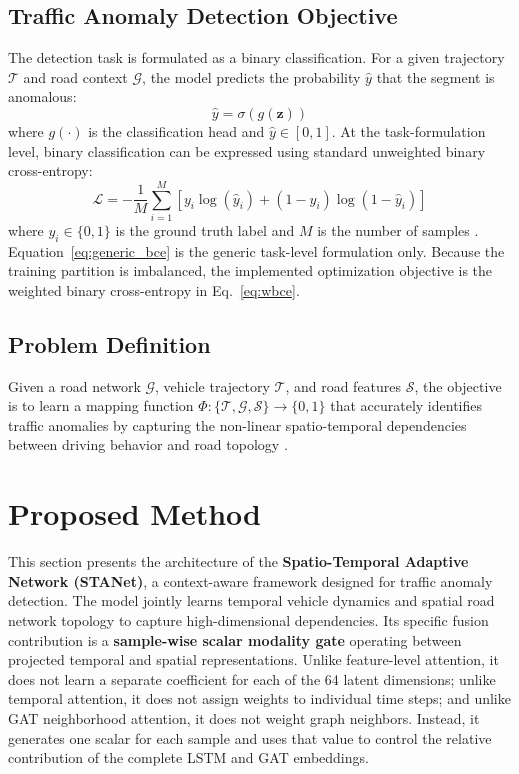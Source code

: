 \documentclass[journal]{IEEEtran}
\begin{document}
\subsection{Traffic Anomaly Detection Objective}
The detection task is formulated as a binary classification. For a given trajectory $\mathcal{T}$ and road context $\mathcal{G}$, the model predicts the probability $\hat{y}$ that the segment is anomalous:
\begin{equation}
  \hat{y} = \sigma(g(\mathbf{z}))
\end{equation}
where $g(\cdot)$ is the classification head and $\hat{y} \in [0, 1]$. At the task-formulation level, binary classification can be expressed using standard unweighted binary cross-entropy:
\begin{equation}
  \label{eq:generic_bce}
  \mathcal{L} = -\frac{1}{M} \sum_{i=1}^{M} [y_i \log(\hat{y}_i) + (1 - y_i) \log(1 - \hat{y}_i)]
\end{equation}
where $y_i \in \{0, 1\}$ is the ground truth label and $M$ is the number of samples \cite{feng_traffic_2024, sun_framework_2025, ma_utfp-ad_2025}.
Equation~\ref{eq:generic_bce} is the generic task-level formulation only. Because the training partition is imbalanced, the implemented optimization objective is the weighted binary cross-entropy in Eq.~\ref{eq:wbce}.

\subsection{Problem Definition}
Given a road network $\mathcal{G}$, vehicle trajectory $\mathcal{T}$, and road features $\mathcal{S}$, the objective is to learn a mapping function $\Phi: \{\mathcal{T}, \mathcal{G}, \mathcal{S}\} \rightarrow \{0, 1\}$ that accurately identifies traffic anomalies by capturing the non-linear spatio-temporal dependencies between driving behavior and road topology \cite{guo_crfpi-net_2026, ren_graph_2024}.

\section{Proposed Method}

This section presents the architecture of the \textbf{Spatio-Temporal Adaptive Network (STANet)}, a context-aware framework designed for traffic anomaly detection. The model jointly learns temporal vehicle dynamics and spatial road network topology to capture high-dimensional dependencies. Its specific fusion contribution is a \textbf{sample-wise scalar modality gate} operating between projected temporal and spatial representations. Unlike feature-level attention, it does not learn a separate coefficient for each of the 64 latent dimensions; unlike temporal attention, it does not assign weights to individual time steps; and unlike GAT neighborhood attention, it does not weight graph neighbors. Instead, it generates one scalar for each sample and uses that value to control the relative contribution of the complete LSTM and GAT embeddings.
\end{document}
